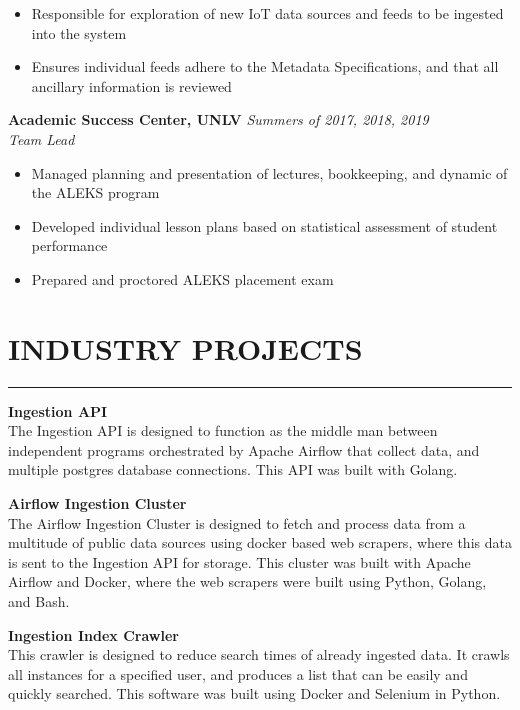\documentclass{res}
\begin{document}
\begin{resume}
			\begin{itemize} \itemsep -2pt
				\item Responsible for exploration of new IoT data sources and feeds to be ingested into the system
				\item Ensures individual feeds adhere to the Metadata Specifications, and that all ancillary information is reviewed
			\end{itemize} \vspace{-2mm}

		{\bf Academic Success Center, UNLV} \hfill \emph{Summers of 2017, 2018, 2019} \\
			\emph{Team Lead}

			\begin{itemize} \itemsep -2pt
				\item Managed planning and presentation of lectures, bookkeeping, and dynamic of the ALEKS program
				\item Developed individual lesson plans based on statistical assessment of student performance
        \item Prepared and proctored ALEKS placement exam
			\end{itemize}

\vspace{-3pt}

		\section{{INDUSTRY PROJECTS}}
    \noindent\rule[0.5ex]{\linewidth}{1pt}
		{\bf Ingestion API} \hfill \vspace{5pt} \\
			The Ingestion API is designed to function as the middle man between independent programs orchestrated by Apache Airflow that collect data, and multiple postgres database connections. This API was built with Golang.
\vspace{-5pt}

		{\bf Airflow Ingestion Cluster} \hfill \vspace{5pt} \\
			The Airflow Ingestion Cluster is designed to fetch and process data from a multitude of public data sources using docker based web scrapers, where this data is sent to the Ingestion API for storage. This cluster was built with Apache Airflow and Docker, where the web scrapers were built using Python, Golang, and Bash.
\vspace{-5pt}

		{\bf Ingestion Index Crawler} \hfill \vspace{5pt}\\
			This crawler is designed to reduce search times of already ingested data. It crawls all instances for a specified user, and produces a list that can be easily and quickly searched. This software was built using Docker and Selenium in Python.
\vspace{-5pt}


\end{resume}
\end{document}
